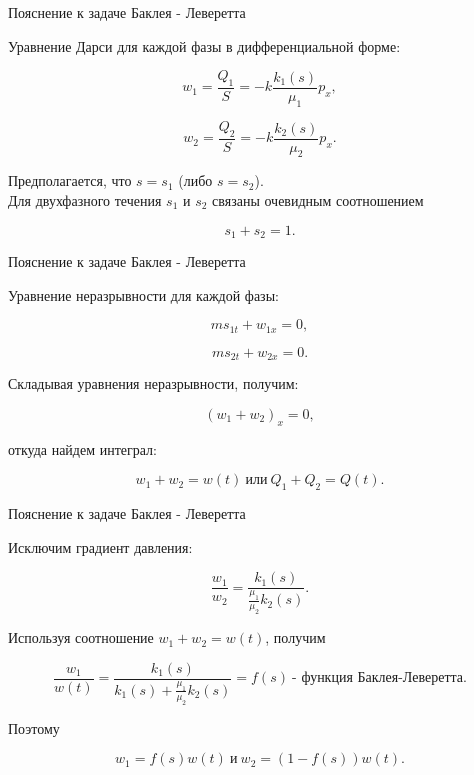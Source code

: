 \documentclass[10pt,xcolor=pst,aspectratio=169]{beamer}
\begin{document}
\begin{frame}{Пояснение к задаче Баклея - Леверетта}

	\transdissolve[duration=0.1]
	\justifying
	\large

	Уравнение Дарси для каждой фазы в дифференциальной форме:

	\[
		w_{1} = \frac{Q_{1}}{S} = - k \frac{k_{1}(s)}{\mu_{1}} p_{x},
	\]

	\[
		w_{2} = \frac{Q_{2}}{S} = - k \frac{k_{2}(s)}{\mu_{2}} p_{x}.
	\]

	Предполагается, что $s = s_{1}$ (либо $s = s_{2}$).\\

	Для двухфазного течения $s_{1}$ и $s_{2}$ связаны очевидным соотношением

	\[
		s_{1} + s_{2} = 1.
	\]

\end{frame}

\begin{frame}{Пояснение к задаче Баклея - Леверетта}

	\transdissolve[duration=0.1]
	\justifying
	\large

	Уравнение неразрывности для каждой фазы:

	\[
		m s_{1t} + w_{1x} = 0,
	\]

	\[
		m s_{2t} + w_{2x} = 0.
	\]

	Складывая уравнения неразрывности, получим:

	\[
		\left( w_{1} + w_{2} \right)_{x} = 0,
	\]

	откуда найдем интеграл:

	\[
		w_{1} + w_{2} = w(t) \: \mbox{или} \: Q_{1} + Q_{2} = Q(t).
	\]

\end{frame}

\begin{frame}{Пояснение к задаче Баклея - Леверетта}

	\transdissolve[duration=0.1]
	\justifying
	\large

	Исключим градиент давления:

	\[
		\frac{w_{1}}{w_{2}} = \frac{k_{1}(s)}{\frac{\mu_{1}}{\mu_{2}} k_{2}(s)}.
	\]

	Используя соотношение $w_{1} + w_{2} = w(t)$, получим

	\[
		\frac{w_{1}}{w(t)} = \frac{k_{1}(s)}{k_{1}(s) + \frac{\mu_{1}}{\mu_{2}} k_{2}(s)} = f(s) \: \mbox{- функция Баклея-Леверетта}.
	\]

	Поэтому

	\[
		w_{1} = f(s) w(t) \: \mbox{и} \: w_{2} = (1 - f(s)) w(t).
	\]

\end{frame}
\end{document}
